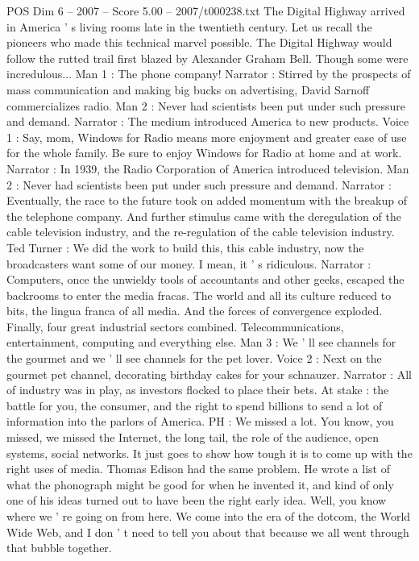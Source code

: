 \begin{textsample}{POS Dim 6 – 2007 – Score 5.00 – 2007/t000238.txt}
The Digital Highway arrived in America ' s living rooms late in the twentieth century.
Let us recall the pioneers who made this technical marvel possible.
The Digital Highway would follow the rutted trail first blazed by Alexander Graham Bell.
Though some were incredulous...
Man 1 : The phone company!
Narrator : Stirred by the prospects of mass communication and making big bucks on advertising, David Sarnoff commercializes radio.
Man 2 : Never had scientists been put under such pressure and demand.
Narrator : The medium introduced America to new products.
Voice 1 : Say, mom, Windows for Radio means more enjoyment and greater ease of use for the whole family.
Be sure to enjoy Windows for Radio at home and at work.
Narrator : In 1939, the Radio Corporation of America introduced television.
Man 2 : Never had scientists been put under such pressure and demand.
Narrator : Eventually, the race to the future took on added momentum with the breakup of the telephone company.
And further stimulus came with the deregulation of the cable television industry, and the re-regulation of the cable television industry.
Ted Turner : We did the work to build this, this cable industry, now the broadcasters want some of our money.
I mean, it ' s ridiculous.
Narrator : Computers, once the unwieldy tools of accountants and other geeks, escaped the backrooms to enter the media fracas.
The world and all its culture reduced to bits, the lingua franca of all media.
And the forces of convergence exploded.
Finally, four great industrial sectors combined.
Telecommunications, entertainment, computing and everything else.
Man 3 : We ' ll see channels for the gourmet and we ' ll see channels for the pet lover.
Voice 2 : Next on the gourmet pet channel, decorating birthday cakes for your schnauzer.
Narrator : All of industry was in play, as investors flocked to place their bets.
At stake : the battle for you, the consumer, and the right to spend billions to send a lot of information into the parlors of America.
PH : We missed a lot.
You know, you missed, we missed the Internet, the long tail, the role of the audience, open systems, social networks.
It just goes to show how tough it is to come up with the right uses of media.
Thomas Edison had the same problem.
He wrote a list of what the phonograph might be good for when he invented it, and kind of only one of his ideas turned out to have been the right early idea.
Well, you know where we ' re going on from here.
We come into the era of the dotcom, the World Wide Web, and I don ' t need to tell you about that because we all went through that bubble together.

\end{textsample}
